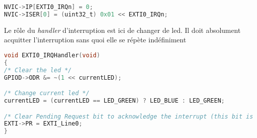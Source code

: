 \documentclass{FicheLecture}
\begin{document}
\begin{lstlisting}[language=C]
NVIC->IP[EXTI0_IRQn] = 0;
NVIC->ISER[0] = (uint32_t) 0x01 << EXTI0_IRQn;
\end{lstlisting}

Le rôle du \emph{handler} d'interruption est ici de changer de led. Il doit absolument acquitter l'interruption sans quoi elle se répète indéfiniment 

\begin{lstlisting}[language=C]
void EXTI0_IRQHandler(void)
{
/* Clear the led */
GPIOD->ODR &= ~(1 << currentLED);

/* Change current led */
currentLED = (currentLED == LED_GREEN) ? LED_BLUE : LED_GREEN;

/* Clear Pending Request bit to acknowledge the interrupt (this bit is cleared by programming it to 1 ! */
EXTI->PR = EXTI_Line0;
}


\end{lstlisting}



\end{document}
